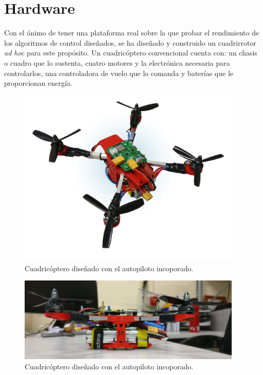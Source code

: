 \chapter{Hardware}

Con el ánimo de tener una plataforma real sobre la que probar el rendimiento de los algoritmos de control diseñados, se ha diseñado y construido un cuadrirrotor \textit{ad hoc} para este propósito. Un cuadricóptero convencional cuenta con: un chasis o cuadro que lo sustenta, cuatro motores y la electrónica necesaria para controlarlos, una controladora de vuelo que lo comanda y baterías que le proporcionan energía.

\begin{figure}[htb!]
	\centering
	\includegraphics[width=0.95\textwidth]{hardware/droneImg}
	\caption{Cuadricóptero diseñado con el autopiloto incoporado. }
	\label{hardware:droneImg}
\end{figure}

\begin{figure}[htb!]
	\centering
	\includegraphics[width=0.95\textwidth]{hardware/Drones_side}
	\caption{Cuadricóptero diseñado con el autopiloto incoporado.}
	\label{hardware:droneImg}
\end{figure}


